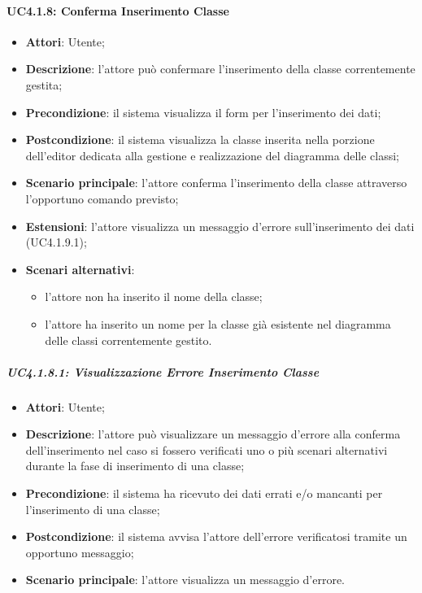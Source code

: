 \paragraph{UC4.1.8: Conferma Inserimento Classe}
\label{UC4.1.8}
\begin{itemize}
\item \textbf{Attori}: Utente;
\item \textbf{Descrizione}: l'attore può confermare l'inserimento della classe correntemente gestita;
\item \textbf{Precondizione}: il sistema visualizza il form per l'inserimento dei dati;	
\item \textbf{Postcondizione}: il sistema visualizza la classe inserita nella porzione dell'editor dedicata alla gestione e realizzazione del diagramma delle classi; 
\item \textbf{Scenario principale}:
l'attore conferma l'inserimento della classe attraverso l'opportuno comando previsto;
\item \textbf{Estensioni}:
l'attore visualizza un messaggio d'errore sull'inserimento dei dati (UC4.1.9.1);
\item \textbf{Scenari alternativi}:
\begin{itemize}
	\item l'attore non ha inserito il nome della classe;
	\item l'attore ha inserito un nome per la classe già esistente nel diagramma delle classi correntemente gestito.
\end{itemize}
\end{itemize}

\subparagraph{UC4.1.8.1: Visualizzazione Errore Inserimento Classe}
\label{UC4.1.8.1}
\begin{itemize}
\item \textbf{Attori}: Utente;
\item \textbf{Descrizione}: l'attore può visualizzare un messaggio d'errore alla conferma dell'inserimento nel caso si fossero verificati uno o più scenari alternativi durante la fase di inserimento di una classe;	
\item \textbf{Precondizione}: il sistema ha ricevuto dei dati errati e/o mancanti per l'inserimento di una classe;	
\item \textbf{Postcondizione}: il sistema avvisa l'attore dell'errore verificatosi tramite un opportuno messaggio;	
\item \textbf{Scenario principale}:
l'attore visualizza un messaggio d'errore.	
\end{itemize}

